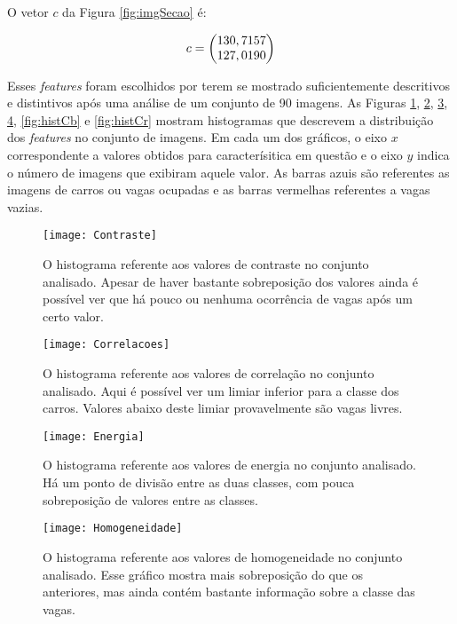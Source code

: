 O vetor $c$ da Figura \ref{fig:imgSecao} é:

\begin{equation}
\centering
\centering
	c = \begin{pmatrix}
	130,7157\\127,0190
	\end{pmatrix}
\centering
\centering
\label{eq:exemploCrominancia}
\end{equation}


Esses \textit{features} foram escolhidos por terem se mostrado suficientemente descritivos e distintivos após uma análise de um conjunto de 90 imagens. As Figuras \ref{fig:histContraste}, \ref{fig:histCorrelacao},  \ref{fig:histEnergia}, \ref{fig:histHomo},  \ref{fig:histCb} e \ref{fig:histCr} mostram histogramas que descrevem a distribuição dos \textit{features} no conjunto de imagens. Em cada um dos gráficos, o eixo $x$ correspondente a valores obtidos para caracterísitica em questão e o eixo $y$ indica o número de imagens que exibiram aquele valor. As barras azuis são referentes as imagens de carros ou vagas ocupadas e as barras vermelhas referentes a vagas vazias.

\begin{figure}
	\centering
	\texttt{[image: Contraste]}
	\caption{O histograma referente aos valores de contraste no conjunto analisado. Apesar de haver bastante sobreposição dos valores ainda é possível ver que há pouco ou nenhuma ocorrência de vagas após um certo valor.}
		\label{fig:histContraste}
	\centering
\end{figure}

\begin{figure}
	\centering
	\texttt{[image: Correlacoes]}
	\caption{O histograma referente aos valores de correlação no conjunto analisado. Aqui é possível ver um limiar inferior para a classe dos carros. Valores abaixo deste limiar provavelmente são vagas livres.}
		\label{fig:histCorrelacao}
	\centering
\end{figure}

\begin{figure}
	\centering
	\texttt{[image: Energia]}
	\caption{O histograma referente aos valores de energia no conjunto analisado. Há um ponto de divisão entre as duas classes, com pouca sobreposição de valores entre as classes.}
		\label{fig:histEnergia}
	\centering
\end{figure}

\begin{figure}
	\centering
	\texttt{[image: Homogeneidade]}
	\caption{O histograma referente aos valores de homogeneidade no conjunto analisado. Esse gráfico mostra mais sobreposição do que os anteriores, mas ainda contém bastante informação sobre a classe das vagas. }
	\label{fig:histHomo}
	\centering
\end{figure}

